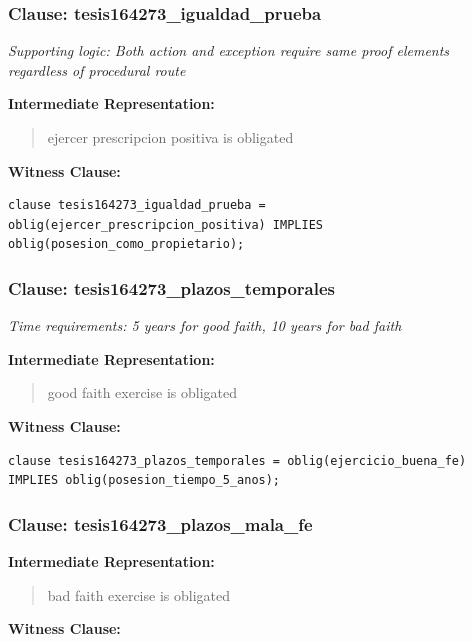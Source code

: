 \documentclass[11pt,a4paper]{article}
\begin{document}
\subsubsection{Clause: tesis164273\_igualdad\_prueba}

\textit{Supporting logic: Both action and exception require same proof elements regardless of procedural route}

\textbf{Intermediate Representation:}

\begin{quote}
ejercer prescripcion positiva is obligated
\end{quote}

\textbf{Witness Clause:}

\begin{lstlisting}[style=witnessstyle, language=Witness]
clause tesis164273_igualdad_prueba = oblig(ejercer_prescripcion_positiva) IMPLIES oblig(posesion_como_propietario);
\end{lstlisting}

\subsubsection{Clause: tesis164273\_plazos\_temporales}

\textit{Time requirements: 5 years for good faith, 10 years for bad faith}

\textbf{Intermediate Representation:}

\begin{quote}
good faith exercise is obligated
\end{quote}

\textbf{Witness Clause:}

\begin{lstlisting}[style=witnessstyle, language=Witness]
clause tesis164273_plazos_temporales = oblig(ejercicio_buena_fe) IMPLIES oblig(posesion_tiempo_5_anos);
\end{lstlisting}

\subsubsection{Clause: tesis164273\_plazos\_mala\_fe}

\textbf{Intermediate Representation:}

\begin{quote}
bad faith exercise is obligated
\end{quote}

\textbf{Witness Clause:}
\end{document}
